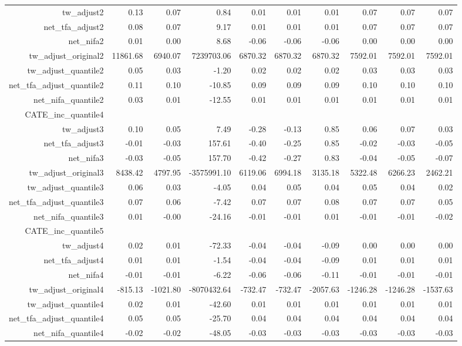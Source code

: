 \begin{table}[ht]
\begin{tabular}{rrrrrrrrrr}
  tw\_adjust2 & 0.13 & 0.07 & 0.84 & 0.01 & 0.01 & 0.01 & 0.07 & 0.07 & 0.07 \\ 
  net\_tfa\_adjust2 & 0.08 & 0.07 & 9.17 & 0.01 & 0.01 & 0.01 & 0.07 & 0.07 & 0.07 \\ 
  net\_nifa2 & 0.01 & 0.00 & 8.68 & -0.06 & -0.06 & -0.06 & 0.00 & 0.00 & 0.00 \\ 
  tw\_adjust\_original2 & 11861.68 & 6940.07 & 7239703.06 & 6870.32 & 6870.32 & 6870.32 & 7592.01 & 7592.01 & 7592.01 \\ 
  tw\_adjust\_quantile2 & 0.05 & 0.03 & -1.20 & 0.02 & 0.02 & 0.02 & 0.03 & 0.03 & 0.03 \\ 
  net\_tfa\_adjust\_quantile2 & 0.11 & 0.10 & -10.85 & 0.09 & 0.09 & 0.09 & 0.10 & 0.10 & 0.10 \\ 
  net\_nifa\_quantile2 & 0.03 & 0.01 & -12.55 & 0.01 & 0.01 & 0.01 & 0.01 & 0.01 & 0.01 \\ 
  CATE\_inc\_quantile4 &  &  &  &  &  &  &  &  &  \\ 
  tw\_adjust3 & 0.10 & 0.05 & 7.49 & -0.28 & -0.13 & 0.85 & 0.06 & 0.07 & 0.03 \\ 
  net\_tfa\_adjust3 & -0.01 & -0.03 & 157.61 & -0.40 & -0.25 & 0.85 & -0.02 & -0.03 & -0.05 \\ 
  net\_nifa3 & -0.03 & -0.05 & 157.70 & -0.42 & -0.27 & 0.83 & -0.04 & -0.05 & -0.07 \\ 
  tw\_adjust\_original3 & 8438.42 & 4797.95 & -3575991.10 & 6119.06 & 6994.18 & 3135.18 & 5322.48 & 6266.23 & 2462.21 \\ 
  tw\_adjust\_quantile3 & 0.06 & 0.03 & -4.05 & 0.04 & 0.05 & 0.04 & 0.05 & 0.04 & 0.02 \\ 
  net\_tfa\_adjust\_quantile3 & 0.07 & 0.06 & -7.42 & 0.07 & 0.07 & 0.08 & 0.07 & 0.07 & 0.05 \\ 
  net\_nifa\_quantile3 & 0.01 & -0.00 & -24.16 & -0.01 & -0.01 & 0.01 & -0.01 & -0.01 & -0.02 \\ 
  CATE\_inc\_quantile5 &  &  &  &  &  &  &  &  &  \\ 
  tw\_adjust4 & 0.02 & 0.01 & -72.33 & -0.04 & -0.04 & -0.09 & 0.00 & 0.00 & 0.00 \\ 
  net\_tfa\_adjust4 & 0.01 & 0.01 & -1.54 & -0.04 & -0.04 & -0.09 & 0.01 & 0.01 & 0.01 \\ 
  net\_nifa4 & -0.01 & -0.01 & -6.22 & -0.06 & -0.06 & -0.11 & -0.01 & -0.01 & -0.01 \\ 
  tw\_adjust\_original4 & -815.13 & -1021.80 & -8070432.64 & -732.47 & -732.47 & -2057.63 & -1246.28 & -1246.28 & -1537.63 \\ 
  tw\_adjust\_quantile4 & 0.02 & 0.01 & -42.60 & 0.01 & 0.01 & 0.01 & 0.01 & 0.01 & 0.01 \\ 
  net\_tfa\_adjust\_quantile4 & 0.05 & 0.05 & -25.70 & 0.04 & 0.04 & 0.04 & 0.04 & 0.04 & 0.04 \\ 
  net\_nifa\_quantile4 & -0.02 & -0.02 & -48.05 & -0.03 & -0.03 & -0.03 & -0.03 & -0.03 & -0.03 \\ 
   \hline
\end{tabular}
\end{table}
